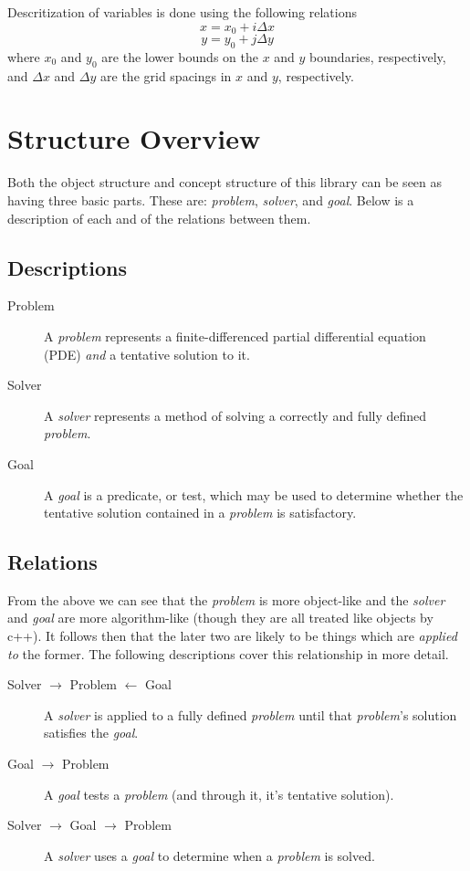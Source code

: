 \documentclass{article}
\begin{document}
Descritization of variables is done using the following relations
\begin{equation}
x = x_{0} + i \Delta x
\end{equation}
\begin{equation}
y = y_{0} + j \Delta y
\end{equation}
where $x_0$ and $y_0$ are the lower bounds on the $x$ and $y$ boundaries, respectively, and $\Delta x$ and
$\Delta y$ are the grid spacings in $x$ and $y$, respectively.
\section{Structure Overview}

Both the object structure and concept structure of this library can be seen as
having three basic parts. These are: \emph{problem}, \emph{solver}, and 
\emph{goal}. Below is a description of each and of the relations between them.

\subsection{Descriptions}

\begin{description}
\item[Problem]
A \emph{problem} represents a finite-differenced partial differential
	equation (PDE) \emph{and} a tentative solution to it.
\item[Solver]
A \emph{solver} represents a method of solving a correctly and fully
	defined \emph{problem}.
\item[Goal]
A \emph{goal} is a predicate, or test, which may be used to determine
	whether the tentative solution contained in a \emph{problem} is 
	satisfactory.
\end{description}

\subsection{Relations}
From the above we can see that the \emph{problem} is more object-like and the
\emph{solver} and \emph{goal} are more algorithm-like (though they are all 
treated like objects by c++). It follows then that the later two are likely to 
be things which are \emph{applied to} the former. The following descriptions 
cover this relationship in more detail.

\begin{description}
\item[Solver $\rightarrow$ Problem $\leftarrow$ Goal]
A \emph{solver} is applied to a fully defined \emph{problem} until that 
\emph{problem}'s
  solution satisfies the \emph{goal}.
\item[Goal $\rightarrow$ Problem]
A \emph{goal} tests a \emph{problem} (and through it, it's tentative solution).
\item[Solver $\rightarrow$ Goal $\rightarrow$ Problem]
  A \emph{solver} uses a \emph{goal} to determine when a \emph{problem} is 
  solved.
\end{description}
\end{document}
